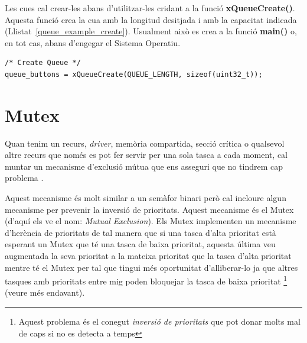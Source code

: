 Les cues cal crear-les abans d'utilitzar-les cridant a la funció {\bf xQueueCreate()}. Aquesta funció crea la cua amb la longitud desitjada i amb la capacitat indicada (Llistat~\ref{queue_example_create}).
Usualment això es crea a la funció {\bf main()} o, en tot cas, abans d'engegar el Sistema Operatiu.

\begin{lstlisting}[style=customc, label=queue_example_create, caption=Creació d'una cua]
/* Create Queue */
queue_buttons = xQueueCreate(QUEUE_LENGTH, sizeof(uint32_t));
\end{lstlisting}

%
%
%

\section{Mutex}
\label{sec:Mutex}
Quan tenim un recurs, {\em driver}, memòria compartida, secció crítica o qualsevol altre recurs que només es pot fer servir per una sola tasca a cada moment, cal muntar un mecanisme d'exclusió mútua que ens asseguri que no tindrem cap problema \cite[244]{FreeRTOSBook}.

Aquest mecanisme és molt similar a un semàfor binari però cal incloure algun mecanisme per prevenir la inversió de prioritats. Aquest mecanisme és el Mutex (d'aquí els ve el nom: {\em Mutual Exclusion}). Els Mutex implementen un mecanisme d'herència de prioritats de tal manera que si una tasca d'alta prioritat està esperant un Mutex que té una tasca de baixa prioritat, aquesta última veu augmentada la seva prioritat a la mateixa prioritat que la tasca d'alta prioritat mentre té el Mutex per tal que tingui més oportunitat d'alliberar-lo ja que altres tasques amb prioritats entre mig poden bloquejar la tasca de baixa prioritat \footnote{Aquest problema és el conegut {\em inversió de prioritats} que pot donar molts mal de caps si no es detecta a temps} (veure  més endavant).


